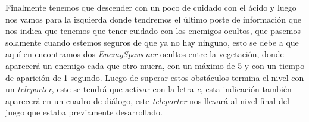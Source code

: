 \documentclass[a4paper,12pt]{article}
\begin{document}
    Finalmente tenemos que descender con un poco de cuidado con el ácido y luego nos vamos para la izquierda donde tendremos el último poste de información que nos indica que tenemos que tener cuidado con los enemigos ocultos, que pasemos solamente cuando estemos seguros de que ya no hay ninguno, esto se debe a que aquí en encontramos dos \textit{EnemySpawener} ocultos entre la vegetación, donde aparecerá un enemigo cada que otro muera, con un máximo de 5 y con un tiempo de aparición de 1 segundo. Luego de superar estos obstáculos termina el nivel con un \textit{teleporter}, este se tendrá que activar con la letra \textit{e}, esta indicación también aparecerá en un cuadro de diálogo, este \textit{teleporter} nos llevará al nivel final del juego que estaba previamente desarrollado.
\end{document}
